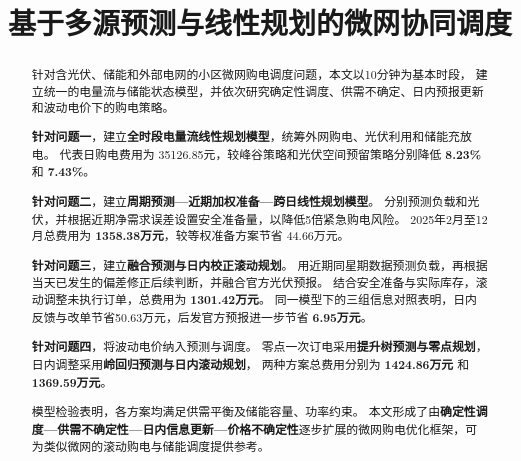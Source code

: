\title{基于多源预测与线性规划的微网协同调度}
\date{}
\maketitle
\begin{abstract}
\noindent\hspace*{2em}针对含光伏、储能和外部电网的小区微网购电调度问题，本文以10分钟为基本时段，
建立统一的电量流与储能状态模型，并依次研究确定性调度、供需不确定、日内预报更新和波动电价下的购电策略。

\textbf{针对问题一}，建立\textbf{全时段电量流线性规划模型}，统筹外网购电、光伏利用和储能充放电。
代表日购电费用为 35126.85元，较峰谷策略和光伏空间预留策略分别降低 \textbf{8.23\%} 和 \textbf{7.43\%}。

\textbf{针对问题二}，建立\textbf{周期预测—近期加权准备—跨日线性规划模型}。
分别预测负载和光伏，并根据近期净需求误差设置安全准备量，以降低5倍紧急购电风险。
2025年2月至12月总费用为 \textbf{1358.38万元}，较等权准备方案节省 44.66万元。

\textbf{针对问题三}，建立\textbf{融合预测与日内校正滚动规划}。
用近期同星期数据预测负载，再根据当天已发生的偏差修正后续判断，并融合官方光伏预报。
结合安全准备与实际库存，滚动调整未执行订单，总费用为 \textbf{1301.42万元}。
同一模型下的三组信息对照表明，日内反馈与改单节省50.63万元，后发官方预报进一步节省 \textbf{6.95万元}。

\textbf{针对问题四}，将波动电价纳入预测与调度。
零点一次订电采用\textbf{提升树预测与零点规划}，日内调整采用\textbf{岭回归预测与日内滚动规划}，
两种方案总费用分别为 \textbf{1424.86万元} 和 \textbf{1369.59万元}。

模型检验表明，各方案均满足供需平衡及储能容量、功率约束。
本文形成了由\textbf{确定性调度—供需不确定性—日内信息更新—价格不确定性}逐步扩展的微网购电优化框架，可为类似微网的滚动购电与储能调度提供参考。
\end{abstract}
